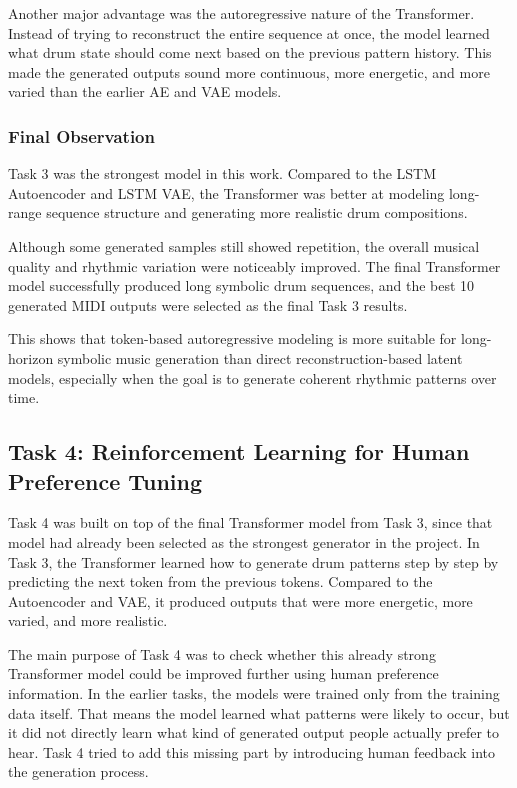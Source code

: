 \documentclass[conference]{IEEEtran}
\begin{document}
Another major advantage was the autoregressive nature of the Transformer. Instead of trying to reconstruct the entire sequence at once, the model learned what drum state should come next based on the previous pattern history. This made the generated outputs sound more continuous, more energetic, and more varied than the earlier AE and VAE models.

\subsubsection{Final Observation}
Task 3 was the strongest model in this work. Compared to the LSTM Autoencoder and LSTM VAE, the Transformer was better at modeling long-range sequence structure and generating more realistic drum compositions.

Although some generated samples still showed repetition, the overall musical quality and rhythmic variation were noticeably improved. The final Transformer model successfully produced long symbolic drum sequences, and the best 10 generated MIDI outputs were selected as the final Task 3 results.

This shows that token-based autoregressive modeling is more suitable for long-horizon symbolic music generation than direct reconstruction-based latent models, especially when the goal is to generate coherent rhythmic patterns over time.

\subsection{Task 4: Reinforcement Learning for Human Preference Tuning}
Task 4 was built on top of the final Transformer model from Task 3, since that model had already been selected as the strongest generator in the project. In Task 3, the Transformer learned how to generate drum patterns step by step by predicting the next token from the previous tokens. Compared to the Autoencoder and VAE, it produced outputs that were more energetic, more varied, and more realistic.

The main purpose of Task 4 was to check whether this already strong Transformer model could be improved further using human preference information. In the earlier tasks, the models were trained only from the training data itself. That means the model learned what patterns were likely to occur, but it did not directly learn what kind of generated output people actually prefer to hear. Task 4 tried to add this missing part by introducing human feedback into the generation process.
\end{document}
